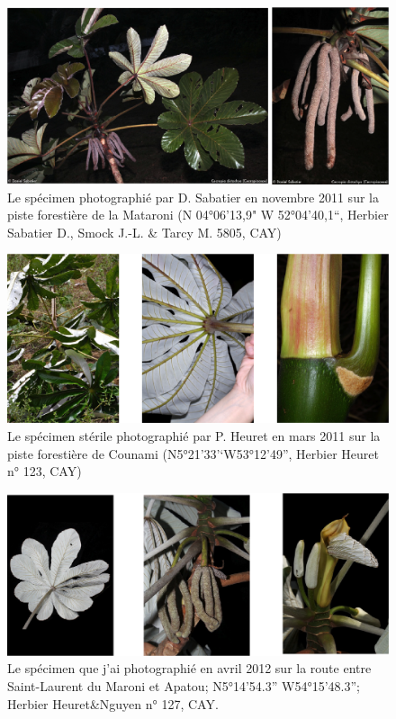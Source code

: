 \documentclass[a4paper]{article}
\theoremstyle{definition}
\theoremstyle{definition}
\theoremstyle{definition}
\theoremstyle{remark}
\begin{document}
\begin{figure}[H]

{\centering \includegraphics[width=0.8\linewidth]{figure/fig11} 

}

\caption{Le spécimen photographié par D. Sabatier en novembre 2011
sur la piste forestière de la Mataroni (N 04°06'13,9" W 52°04'40,1``,
Herbier Sabatier D., Smock J.-L. \& Tarcy M. 5805, CAY)}\label{fig:fig11}
\end{figure}





\begin{figure}[H]

{\centering \includegraphics[width=0.8\linewidth]{figure/fig12} 

}

\caption{Le spécimen stérile photographié par P. Heuret en mars
2011 sur la piste forestière de Counami (N5°21'33'`W53°12'49'', Herbier
Heuret n° 123, CAY)}\label{fig:fig12}
\end{figure}





\begin{figure}[H]

{\centering \includegraphics[width=0.8\linewidth]{figure/fig13} 

}

\caption{Le spécimen que j'ai photographié en avril 2012 sur la
route entre Saint-Laurent du Maroni et Apatou; N5°14'54.3''
W54°15'48.3''; Herbier Heuret\&Nguyen n° 127, CAY.}\label{fig:fig13}
\end{figure}
\end{document}
